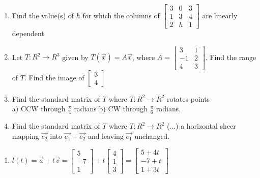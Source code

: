 \documentclass[12pt]{article}
\begin{document}
\begin{enumerate}
        \item Find the value(s) of $h$ for which the columns of $\left[\begin{array}{rrr}3&0&3\\1&3&4\\2&h&1\end{array}\right]$ are linearly dependent 
        \item Let $T:R^2\rightarrow R^3$ given by $T(\vec{x})=A\vec{x}$, where $A=\left[\begin{array}{rr}3&1\\-1&2\\4&3\end{array}\right]$. Find the range of $T$. Find the image of $\left[\begin{array}{c}3\\4\end{array}\right]$
        \item Find the standard matrix of $T$ where $T:R^2\rightarrow R^2$ rotates points\\ a) CCW through $\frac{\pi}{4}$ radians b) CW through $\frac{\pi}{6}$ radians.
        \item Find the standard matrix of $T$ where $T:R^2\rightarrow R^2$ (...) a horizontal sheer mapping $\vec{e_2}$ into $\vec{e_1}+\vec{e_2}$ and leaving $\vec{e_1}$ unchanged.
    \end{enumerate}
    \newpage
    \begin{enumerate}
        \item $l(t)=\vec{a}+t\vec{v}=\left[\begin{array}{c}5\\-7\\1\end{array}\right]+t\left[\begin{array}{c}4\\1\\3\end{array}\right]=\left[\begin{array}{c}5+4t\\-7+t\\1+3t\end{array}\right]$
    \end{enumerate}
\end{document}

